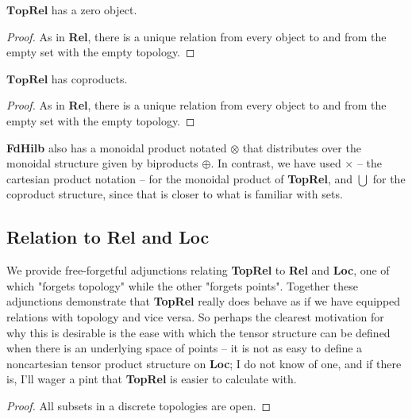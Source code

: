 \begin{proposition}
$\mathbf{TopRel}$ has a zero object.
\begin{proof}
As in \textbf{Rel}, there is a unique relation from every object to and from the empty set with the empty topology.
\end{proof}
\end{proposition}

\begin{proposition}
$\mathbf{TopRel}$ has coproducts.
\begin{proof}
As in \textbf{Rel}, there is a unique relation from every object to and from the empty set with the empty topology.
\end{proof}
\end{proposition}

\begin{notation}
\textbf{FdHilb} also has a monoidal product notated $\otimes$ that distributes over the monoidal structure given by biproducts $\oplus$. In contrast, we have used $\times$ -- the cartesian product notation -- for the monoidal product of \textbf{TopRel}, and $\bigcup$ for the coproduct structure, since that is closer to what is familiar with sets.
\end{notation}

\subsection{Relation to \textbf{Rel} and \textbf{Loc}}

We provide free-forgetful adjunctions relating \textbf{TopRel} to \textbf{Rel} and \textbf{Loc}, one of which "forgets topology" while the other "forgets points". Together these adjunctions demonstrate that \textbf{TopRel} really does behave as if we have equipped relations with topology and vice versa. So perhaps the clearest motivation for why this is desirable is the ease with which the tensor structure can be defined when there is an underlying space of points -- it is not as easy to define a noncartesian tensor product structure on \textbf{Loc}; I do not know of one, and if there is, I'll wager a pint that \textbf{TopRel} is easier to calculate with.


\begin{lemma}\label{lem:disccont}
\begin{proof}
All subsets in a discrete topologies are open.
\end{proof}
\end{lemma}


